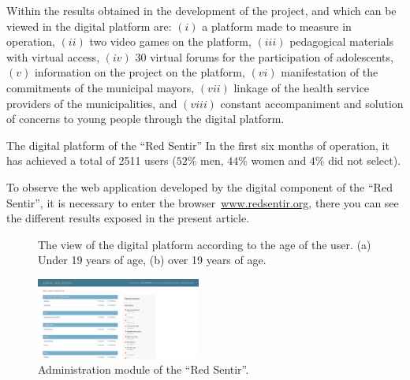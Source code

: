 \documentclass[journal,transmag]{IEEEtran}
\begin{document}
Within the results obtained in the development of the project, and which can be viewed in the digital platform are: $(i)$ a platform made to measure in operation, $(ii)$ two video games on the platform, $(iii)$ pedagogical materials with virtual access, $(iv)$ $30$ virtual forums for the participation of adolescents, $(v)$ information on the project on the platform, $(vi)$ manifestation of the commitments of the municipal mayors, $(vii)$ linkage of the health service providers of the municipalities, and $(viii)$ constant accompaniment and solution of concerns to young people through the digital platform.

The digital platform of the ``Red Sentir” In the first six months of operation, it has achieved a total of 2511 users ($52\%$ men, $44\%$ women and $4\%$ did not select).

To observe the web application developed by the digital component of the ``Red Sentir'', it is necessary to enter the browser~\url{www.redsentir.org}, there you can see the different results exposed in the present article.

\begin{figure}[tbp]
  \centering
	  \hspace{1mm}
  \caption{The view of the digital platform according to the age of the user. (a) Under 19 years of age, (b) over 19 years of age.}
  \label{fig:vista_plataforma}
\end{figure}

\begin{figure}[tbp]
\centering
\includegraphics[width=0.48\textwidth]{admin.png}
\caption{Administration module of the ``Red Sentir''.}
\label{fig:admin}
\end{figure}
\end{document}
